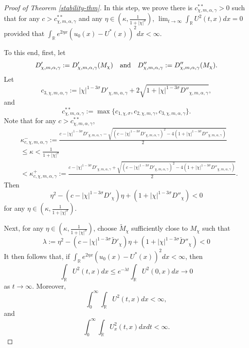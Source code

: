 \documentclass[11pt]{article} %
\theoremstyle{remark}
\theoremstyle{remark}
\numberwithin{equation}{section}
\numberwithin{figure}{section}
\numberwithin{table}{section}
\newcommand\RR{\ensuremath{\mathbb{R}}}
\begin{document}
\begin{proof}[Proof of Theorem \ref{stability-thm}]
  In this  step, we prove there is $c^{**}_{\chi,m,\alpha,\gamma}>0$ such that for any $c>c^{**}_{\chi,m,\alpha,\gamma}$ and any $\eta\in (\kappa,\frac{1}{1+|\chi|^\sigma})$,  $\lim_{t\to\infty} \int_{\RR}U^2(t,x)dx=0$ provided that $\int_{\RR} e^{2\eta x}(u_0(x)-U^*(x))^2dx<\infty$.

\smallskip

To this end, first,  let 
$$
D'_{\chi,m,\alpha,\gamma}:=D'_{\chi,m,\alpha,\gamma}(M_\chi)\quad {\rm and}\quad D''_{\chi,m,\alpha,\gamma}:=D''_{\chi,m,\alpha,\gamma}(M_\chi).
$$ 
Let 
$$
c_{3,\chi,m,\alpha,\gamma}:=|\chi|^{1-3\sigma} D'_{\chi,m,\alpha,\gamma}+ 2\sqrt{1+|\chi|^{1-3\sigma} D''_{\chi,m,\alpha,\gamma}},
$$
and
\begin{equation}
\label{c-star-star-eq}
c^{**}_{\chi,m,\alpha,\gamma}:=\max\{c_{1,\chi,\sigma},c_{2,\chi,m,\gamma},c_{3,\chi,m,\alpha,\gamma}\}.
\end{equation} 
Note that for any $c>c^{**}_{\chi,m,\alpha,\gamma}$, 
\begin{align}
\label{eta-eq}
&\kappa^-_{c,\chi,m,\alpha,\gamma}:=\frac{c-|\chi|^{1-3\sigma} D'_{\chi,m,\alpha,\gamma}-\sqrt {(c-|\chi|^{1-3\sigma}D'_{\chi,m,\alpha,\gamma})^2 -4 (1+|\chi|^{1-3\sigma}D''_{\chi,m,\alpha,\gamma})}}{2}\nonumber\\
&\le \kappa <\frac{1}{1+|\chi|^\sigma}\nonumber\\
&<\kappa^+_{c,\chi,m,\alpha,\gamma}:=\frac{c-|\chi|^{1-3\sigma} D'_{\chi,m,\alpha,\gamma}+\sqrt {(c-|\chi|^{1-3\sigma}D'_{\chi,m,\alpha,\gamma})^2 -4 (1+|\chi|^{1-3\sigma}D''_{\chi,m,\alpha,\gamma})}}{2}.
\end{align}
Then
$$
 \eta^2 -(c-|\chi|^{1-3\sigma}  D'_{\chi}) \eta +(1+|\chi|^{1-3\sigma}  D''_{\chi})
<0
$$
for any $\eta\in (\kappa,\frac{1}{1+|\chi|^\sigma})$. 

Next,  for any $\eta\in (\kappa,\frac{1}{1+|\chi|^\sigma})$,
choose $\widetilde M_\chi$ sufficiently close to $M_\chi$ such that
$$
\lambda:= \eta^2 -(c-|\chi|^{1-3\sigma} \widetilde D'_{\chi}) \eta +(1+|\chi|^{1-3\sigma} \widetilde D''_{\chi})
<0
$$
It then follows that,   if $\int_{\RR} e^{2\eta x} (u_0(x)-U^*(x))^2dx<\infty$, then
$$
\int_{\RR}U^2(t,x)dx\le e^{-\lambda t} \int_{\RR} U^2(0,x)dx\to 0
$$
as $t\to\infty$. Moreover, 
\begin{equation}
\label{new-aux-U-eq1}
\int_0^\infty \int_{\RR} U^2(t,x)dx<\infty,
\end{equation}
and
\begin{equation}
\label{new-aux-U-eq2}
\int_0^\infty \int_{\RR} U_x^2(t,x)dx dt<\infty.
\end{equation}






\end{proof}
\end{document}
